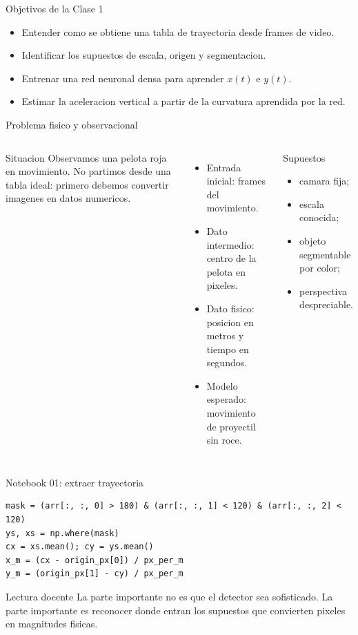 \begin{frame}{Objetivos de la Clase 1}
\begin{itemize}
    \item Entender como se obtiene una tabla de trayectoria desde frames de video.
    \item Identificar los supuestos de escala, origen y segmentacion.
    \item Entrenar una red neuronal densa para aprender $x(t)$ e $y(t)$.
    \item Estimar la aceleracion vertical a partir de la curvatura aprendida por la red.
\end{itemize}
\end{frame}

\begin{frame}{Problema fisico y observacional}
\begin{columns}[T,onlytextwidth]
\begin{block}{Situacion}
Observamos una pelota roja en movimiento. No partimos desde una tabla ideal: primero debemos convertir imagenes en datos numericos.
\end{block}
\begin{itemize}
    \item Entrada inicial: frames del movimiento.
    \item Dato intermedio: centro de la pelota en pixeles.
    \item Dato fisico: posicion en metros y tiempo en segundos.
    \item Modelo esperado: movimiento de proyectil sin roce.
\end{itemize}
\begin{alertblock}{Supuestos}
\begin{itemize}
    \item camara fija;
    \item escala conocida;
    \item objeto segmentable por color;
    \item perspectiva despreciable.
\end{itemize}
\end{alertblock}
\end{columns}
\end{frame}

\begin{frame}[fragile]{Notebook 01: extraer trayectoria}
\begin{verbatim}
mask = (arr[:, :, 0] > 180) & (arr[:, :, 1] < 120) & (arr[:, :, 2] < 120)
ys, xs = np.where(mask)
cx = xs.mean(); cy = ys.mean()
x_m = (cx - origin_px[0]) / px_per_m
y_m = (origin_px[1] - cy) / px_per_m
\end{verbatim}
\begin{block}{Lectura docente}
La parte importante no es que el detector sea sofisticado. La parte importante es reconocer donde entran los supuestos que convierten pixeles en magnitudes fisicas.
\end{block}
\end{frame}

